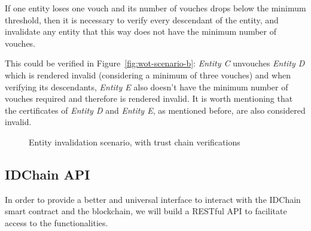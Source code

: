 If one entity loses one vouch and its number of vouches drops below the minimum threshold, then it is necessary to verify every descendant of the entity, and invalidate any entity that this way does not have the minimum number of vouches.

This could be verified in Figure~\ref{fig:wot-scenario-b}: \textit{Entity C} unvouches \textit{Entity D} which is rendered invalid (considering a minimum of three vouches) and when verifying its descendants, \textit{Entity E} also doesn't have the minimum number of vouches required and therefore is rendered invalid.
It is worth mentioning that the certificates of \textit{Entity D} and \textit{Entity E}, as mentioned before, are also considered invalid.

\begin{figure}[htb]
  \centering
  \caption{Entity invalidation scenario, with trust chain verifications}
\end{figure}

\subsection{IDChain \ac{API}}

In order to provide a better and universal interface to interact with the IDChain smart contract and the blockchain, we will build a RESTful \ac{API} to facilitate access to the functionalities.

